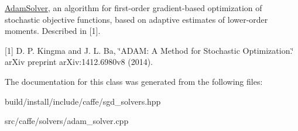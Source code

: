\mbox{\hyperlink{classcaffe_1_1_adam_solver}{Adam\+Solver}}, an algorithm for first-\/order gradient-\/based optimization of stochastic objective functions, based on adaptive estimates of lower-\/order moments. Described in \mbox{[}1\mbox{]}. 

\mbox{[}1\mbox{]} D. P. Kingma and J. L. Ba, \char`\"{}\+A\+D\+A\+M\+: A Method for Stochastic Optimization.\char`\"{} ar\+Xiv preprint ar\+Xiv\+:1412.\+6980v8 (2014). 

The documentation for this class was generated from the following files\+:\begin{DoxyCompactItemize}
\item 
build/install/include/caffe/sgd\+\_\+solvers.\+hpp\item 
src/caffe/solvers/adam\+\_\+solver.\+cpp\end{DoxyCompactItemize}
